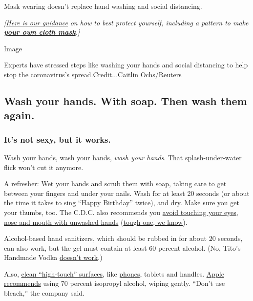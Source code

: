 Mask wearing doesn't replace hand washing and social distancing.

\emph{{[}}\href{https://www.nytimes.com/article/coronavirus-N95-mask-DIY-face-mask-health.html}{\emph{Here
is our guidance}} \emph{on how to best protect yourself, including a
pattern to make}
\textbf{\href{https://www.nytimes.com/article/how-to-make-face-mask-coronavirus.html}{\emph{your
own cloth mask}}}\emph{.{]}}

Image

Experts have stressed steps like washing your hands and social
distancing to help stop the coronavirus's spread.Credit...Caitlin
Ochs/Reuters

\hypertarget{wash-your-hands-with-soap-then-wash-them-again}{%
\subsection{Wash your hands. With soap. Then wash them
again.}\label{wash-your-hands-with-soap-then-wash-them-again}}

\hypertarget{its-not-sexy-but-it-works}{%
\subsubsection{It's not sexy, but it
works.}\label{its-not-sexy-but-it-works}}

Wash your hands, wash your hands,
\href{https://www.nytimes.com/2020/03/13/world/how-to-wash-your-hands-coronavirus.html}{\emph{wash
your hands}}. That splash-under-water flick won't cut it anymore.

A refresher: Wet your hands and scrub them with soap, taking care to get
between your fingers and under your nails. Wash for at least 20 seconds
(or about the time it takes to sing ``Happy Birthday'' twice), and dry.
Make sure you get your thumbs, too. The C.D.C. also recommends you
\href{https://www.cdc.gov/coronavirus/2019-ncov/hcp/guidance-prevent-spread.html}{avoid
touching your eyes, nose and mouth with unwashed hands}
(\href{https://www.nytimes.com/2020/03/05/health/stop-touching-your-face-coronavirus.html}{tough
one, we know}).

Alcohol-based hand sanitizers, which should be rubbed in for about 20
seconds, can also work, but the gel must contain at least 60 percent
alcohol. (No, Tito's Handmade Vodka
\href{https://www.cnn.com/2020/03/05/us/titos-vodka-coronavirus-trnd/index.html}{doesn't
work}.)

Also,
\href{https://www.cdc.gov/coronavirus/2019-ncov/hcp/guidance-prevent-spread.html}{clean
``high-touch'' surfaces}, like
\href{https://www.nytimes.com/2020/03/12/smarter-living/clean-your-phone.html}{phones},
tablets and handles.
\href{https://support.apple.com/en-us/HT204172?mod=article_inline}{Apple
recommends} using 70 percent isopropyl alcohol, wiping gently. ``Don't
use bleach,'' the company said.

